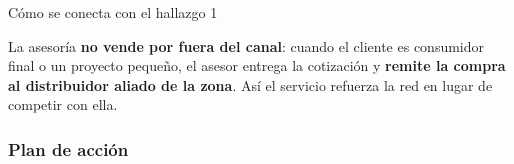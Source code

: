\documentclass[11pt,a4paper]{article}
\begin{document}
\begin{cajainfo}{Cómo se conecta con el hallazgo 1}

La asesoría \textbf{no vende por fuera del canal}: cuando el cliente es consumidor final o un
proyecto pequeño, el asesor entrega la cotización y \textbf{remite la compra al distribuidor aliado
de la zona}. Así el servicio refuerza la red en lugar de competir con ella.

\end{cajainfo}


\hypertarget{plan-de-acciuxf3n-2}{%
\subsubsection*{Plan de acción}\label{plan-de-acciuxf3n-2}}
\end{document}
